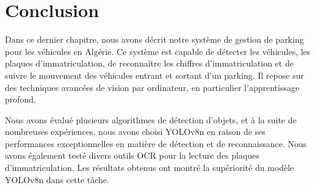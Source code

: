 \section{Conclusion}

Dans ce dernier chapitre, nous avons décrit notre système de gestion de parking pour les véhicules en Algérie. Ce système est capable de détecter les véhicules, les plaques d'immatriculation, de reconnaître les chiffres d'immatriculation et de suivre le mouvement des véhicules entrant et sortant d'un parking. Il repose sur des techniques avancées de vision par ordinateur, en particulier l'apprentissage profond.

Nous avons évalué plusieurs algorithmes de détection d'objets, et à la suite de nombreuses expériences, nous avons choisi YOLOv8n en raison de ses performances exceptionnelles en matière de détection et de reconnaissance. Nous avons également testé divers outils OCR pour la lecture des plaques d'immatriculation. Les résultats obtenus ont montré la supériorité du modèle YOLOv8n dans cette tâche.
